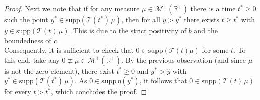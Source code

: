 \documentclass[12pt,a4paper]{amsart}
\newcommand{\ud}{\mathrm{d}}
\newcommand{\R}{\mathbb{R}}
\begin{document}
\begin{proof}
Next we note that if for any measure $\mu\in \mathcal{M}^+(\R^+)$ there is a time $t^*\ge 0$ such the point $y^*\in \text{supp}(\mathcal{T}(t^*)\,\mu)$,
then for all $y>y^*$ there exists $t\ge t^*$ with $y\in\text{supp}(\mathcal{T}(t)\,\mu)$. This is due to the strict positivity of $b$ and the boundedness of $c$. \\

\noindent  Consequently, it is sufficient to check that $0\in \mathrm{supp}(\mathcal{T}(t)\mu)$ for some $t$. To this end, take any $0\not\equiv \mu\in \mathcal{M}^+(\R^+)$. By the previous observation (and since $\mu$ is not the zero element), there exist $t^*\ge 0$ and $y^*>\hat{y}$ with  $y^*\in\mathrm{supp}(\mathcal{T}(t^*)\,\mu)$. As $0\in \mathrm{supp}\,\eta(y^*)$, it follows that $0\in \mathrm{supp}(\mathcal{T}(t)\,\mu)$ for every $t>t^*$, which concludes the proof.
\end{proof}
\end{document}
